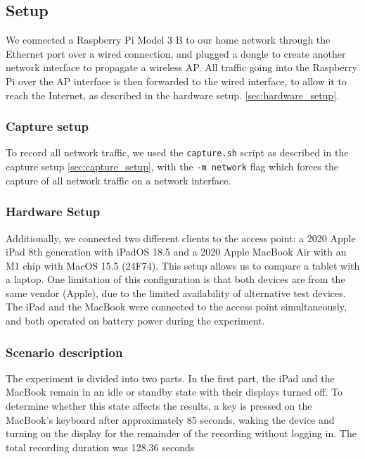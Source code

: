 \documentclass[sigconf,nonacm]{acmart}
\begin{document}
\subsection{Setup}
\label{sec:part-2/setup}
We connected a Raspberry Pi Model 3 B to our home network through the Ethernet port over a wired connection, and plugged a dongle to create another network interface to propagate a wireless AP. All traffic going into the Raspberry Pi over the AP interface is then forwarded to the wired interface, to allow it to reach the Internet, as described in the hardware setup. \cref {sec:hardware_setup}.

\subsubsection{Capture setup}
\label{sec:part-2/da-co}
To record all network traffic, we used the \verb|capture.sh| script as described in the capture setup \cref{sec:capture_setup}, with the \verb|-m network| flag which forces the capture of all network traffic on a network interface.

\subsubsection{Hardware Setup}
Additionally, we connected two different clients to the access point: a 2020 Apple iPad 8th generation with iPadOS 18.5 and a 2020 Apple MacBook Air with an M1 chip with MacOS 15.5 (24F74). This setup allows us to compare a tablet with a laptop. One limitation of this configuration is that both devices are from the same vendor (Apple), due to the limited availability of alternative test devices. The iPad and the MacBook were connected to the access point simultaneously, and both operated on battery power during the experiment.

\subsubsection{Scenario description}
\label{section:scenario_description}
The experiment is divided into two parts. In the first part, the iPad and the MacBook remain in an idle or standby state with their displays turned off. To determine whether this state affects the results, a key is pressed on the MacBook’s keyboard after approximately 85 seconds, waking the device and turning on the display for the remainder of the recording without logging in. The total recording duration was 128.36 seconds
\end{document}

